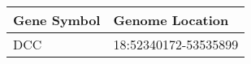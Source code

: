 \begin{tabular}{ll}
\toprule
Gene Symbol &      Genome Location \\
\midrule
        DCC & 18:52340172-53535899 \\
\bottomrule
\end{tabular}
